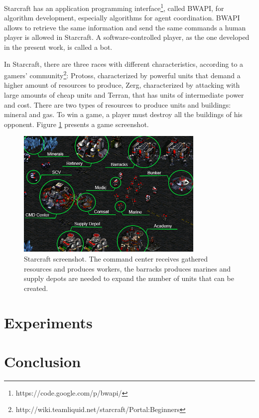 \documentclass[a4paper]{sbgames}
\begin{document}
Starcraft has an application programming interface\footnote{https://code.google.com/p/bwapi/}, called BWAPI, for algorithm development, especially algorithms for agent coordination. BWAPI allows to retrieve the same information and send the same commands a human player is allowed in Starcraft. A software-controlled player, as the one developed in the present work, is called a bot. 

In Starcraft, there are three races with different characteristics, according to a gamers' community\footnote{http://wiki.teamliquid.net/starcraft/Portal:Beginners}: Protoss, characterized by powerful units that demand a higher amount of resources to produce, Zerg, characterized by attacking with large amounts of cheap units and Terran, that has units of intermediate power and cost. There are two types of resources to produce units and buildings: mineral and gas. To win a game, a player must destroy all the buildings of his opponent. Figure \ref{fig:scsshot} presents a game screenshot.

\begin{figure}[ht]
    \centerline{\includegraphics[width=9cm]{img/starcraft_items.png}}
    \caption{Starcraft screenshot. The command center receives gathered resources and produces workers, the barracks produces marines and supply depots are needed to expand the number of units that can be created.}
    \label{fig:scsshot}
\end{figure}

\section{Experiments}
\label{sec:experiments}




\section{Conclusion}
\label{sec:conclusion}
\end{document}
